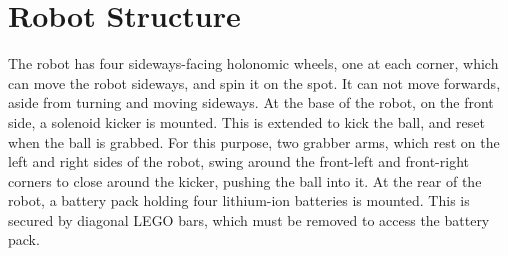 \section{Robot Structure}

The robot has four sideways-facing holonomic wheels, one at each corner, which
can move the robot sideways, and spin it on the spot. It can not move forwards,
aside from turning and moving sideways. At the base of the robot, on the
front side, a solenoid kicker is mounted. This is extended to kick the ball,
and reset when the ball is grabbed. For this purpose, two grabber arms, which
rest on the left and right sides of the robot, swing around the front-left and
front-right corners to close around the kicker, pushing the ball into it. At
the rear of the robot, a battery pack holding four lithium-ion batteries is
mounted. This is secured by diagonal LEGO bars, which must be removed to access
the battery pack.
